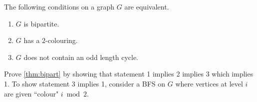 \begin{Theorem} 
\label{thm:bipart}
The following conditions on a graph $G$ are equivalent.
\begin{enumerate}
  \item $G$ is bipartite.
  \item $G$ has a $2$-colouring.
  \item $G$ does not contain an odd length cycle.
\end{enumerate}
\end{Theorem}
\begin{Boxample}[6]
Prove \cref{thm:bipart}  by showing that statement 1 implies 2 implies 3 which implies 1. 
To show statement 3 implies 1, consider a BFS on $G$ where vertices at level $i$ are given ``colour" $i \bmod 2$.
\end{Boxample}
